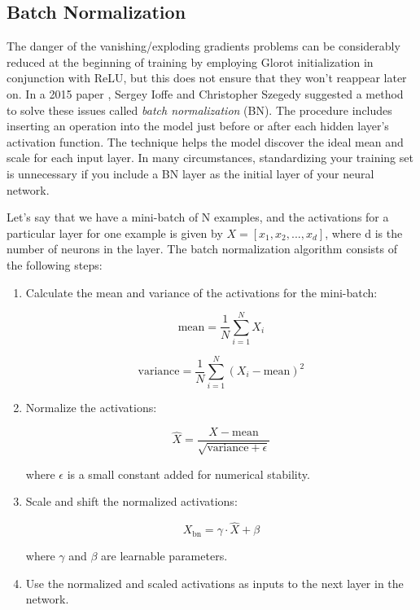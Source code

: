 \subsection{Batch Normalization}
The danger of the vanishing/exploding gradients problems can be considerably reduced at the beginning of training by employing Glorot initialization in conjunction with ReLU, but this does not ensure that they won't reappear later on.
In a 2015 paper \parencite{ioffe2015batch}, Sergey Ioffe and Christopher Szegedy suggested a method to solve these issues called \textit{batch normalization} (BN). The procedure includes inserting an operation into the model just before or after each hidden layer's activation function. The technique helps the model discover the ideal mean and scale for each input layer. In many circumstances, standardizing your training set is unnecessary if you include a BN layer as the initial layer of your neural network.

\hspace{1cm}

Let's say that we have a mini-batch of N examples, and the activations for a particular layer for one example is given by $X = [x_1, x_2, ..., x_d]$, where d is the number of neurons in the layer. The batch normalization algorithm consists of the following steps:

\begin{enumerate}
\item Calculate the mean and variance of the activations for the mini-batch:

\begin{equation}
\text{mean} = \frac{1}{N} \sum_{i=1}^{N} X_i
\end{equation}

\begin{equation}
\text{variance} = \frac{1}{N} \sum_{i=1}^{N} (X_i - \text{mean})^2
\end{equation}

\item Normalize the activations:

\begin{equation}
\hat{X} = \frac{X - \text{mean}}{\sqrt{\text{variance} + \epsilon}}
\end{equation}

where $\epsilon$ is a small constant added for numerical stability.

\item Scale and shift the normalized activations:

\begin{equation}
X_{\text{bn}} = \gamma \cdot \hat{X} + \beta
\end{equation}

where $\gamma$ and $\beta$ are learnable parameters.

\item Use the normalized and scaled activations as inputs to the next layer in the network.
\end{enumerate}

